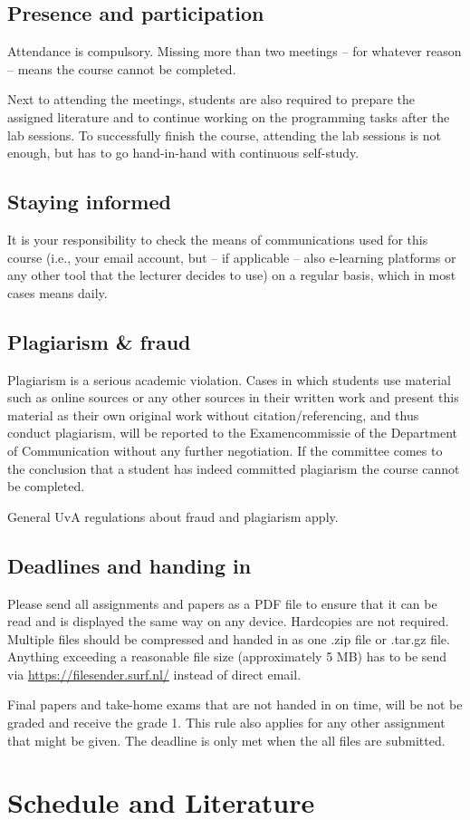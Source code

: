 \documentclass[a4paper,10pt]{report}
\begin{document}
\section{Presence and participation}
Attendance is compulsory. Missing more than two meetings – for whatever reason – means the course cannot be completed.

Next to attending the meetings, students are also required to prepare the assigned literature and to continue working on the programming tasks after the lab sessions. To successfully finish the course, attending the lab sessions is not enough, but has to go hand-in-hand with continuous self-study.

\section{Staying informed}
It is your responsibility to check the means of communications used for this course (i.e., your email account, but – if applicable – also e-learning platforms or any other tool that the lecturer decides to use) on a regular basis, which in most cases means daily.

\section{Plagiarism \& fraud}
Plagiarism is a serious academic violation. Cases in which students use material such as online sources or any other sources in their written work and present this material as their own original work without citation/referencing, and thus conduct plagiarism, will be reported to the Examencommissie of the Department of Communication without any further negotiation. If the committee comes to the conclusion that a student has indeed committed plagiarism the course cannot be completed. 

General UvA regulations about fraud and plagiarism apply.

\section{Deadlines and handing in}
Please send all assignments and papers as a PDF file to ensure that it can be read and is displayed the same way on any device. Hardcopies are not required. Multiple files should be compressed and handed in as one .zip file or .tar.gz file. Anything exceeding a reasonable file size (approximately 5 MB) has to be send via \url{https://filesender.surf.nl/} instead of direct email.

Final papers and take-home exams that are not handed in on time, will be not be graded and receive the grade 1. This rule also applies for any other assignment that might be given. The deadline is only met when the all files are submitted.

\chapter{Schedule and Literature}






 
 
 
\end{document}
